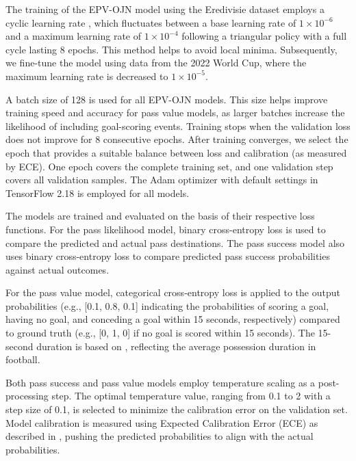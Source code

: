 The training of the EPV-OJN model using the Eredivisie dataset employs a cyclic learning rate \citep{smith2017cyclical}, which fluctuates between a base learning rate of $1 \times 10^{-6}$ and a maximum learning rate of $1 \times 10^{-4}$ following a triangular policy with a full cycle lasting 8 epochs. This method helps to avoid local minima. Subsequently, we fine-tune the model using data from the 2022 World Cup, where the maximum learning rate is decreased to $1 \times 10^{-5}$.

A batch size of 128 is used for all EPV-OJN models. This size helps improve training speed and accuracy for pass value models, as larger batches increase the likelihood of including goal-scoring events. Training stops when the validation loss does not improve for 8 consecutive epochs. After training converges, we select the epoch that provides a suitable balance between loss and calibration (as measured by ECE). One epoch covers the complete training set, and one validation step covers all validation samples. The Adam optimizer \citep{Kingma2014AdamAM} with default settings in TensorFlow 2.18 \citep{tensorflow2015-whitepaper} is employed for all models.

The models are trained and evaluated on the basis of their respective loss functions. For the pass likelihood model, binary cross-entropy loss is used to compare the predicted and actual pass destinations. The pass success model also uses binary cross-entropy loss to compare predicted pass success probabilities against actual outcomes.

For the pass value model, categorical cross-entropy loss is applied to the output probabilities (e.g., [0.1, 0.8, 0.1] indicating the probabilities of scoring a goal, having no goal, and conceding a goal within 15 seconds, respectively) compared to ground truth (e.g., [0, 1, 0] if no goal is scored within 15 seconds). The 15-second duration is based on \cite{Fernández2021}, reflecting the average possession duration in football.

Both pass success and pass value models employ temperature scaling as a post-processing step. The optimal temperature value, ranging from 0.1 to 2 with a step size of 0.1, is selected to minimize the calibration error on the validation set. Model calibration is measured using Expected Calibration Error (ECE) as described in \cite{Fernández2021}, pushing the predicted probabilities to align with the actual probabilities.
